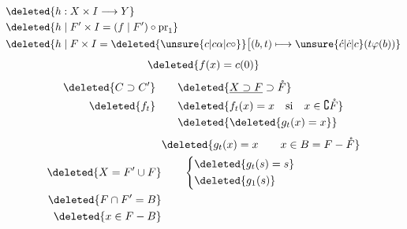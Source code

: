 \[
\begin{aligned}
&\deleted{h:X\times I\longrightarrow Y}\\
&\deleted{h\mid F'\times I=(f\mid F')\circ\mathrm{pr}_1}\\
&\deleted{h\mid F\times I=\deleted{\unsure{c|c\alpha|c\circ}}\bigl[(b,t)\longmapsto\unsure{\acute c|\dot c|c}(t\varphi(b))}
\end{aligned}
\]
\[
\deleted{f(x)=c(0)}
\]
\[
\begin{aligned}
\deleted{C\supset C'}&\qquad\deleted{\underline{X\supset F}\supset\mathring F}\\
\deleted{f_t}&\qquad\deleted{f_t(x)=x\quad\text{si}\quad x\in\complement\mathring F}\\
&\qquad\deleted{\deleted{g_t(x)=x}}
\end{aligned}
\]
\[
\begin{aligned}
&\deleted{g_t(x)=x\qquad x\in B=F-\mathring F}\\
\deleted{X=F'\cup F}&\qquad\left\{\begin{aligned}
&\deleted{g_t(s)=s}\\
&\deleted{g_1(s)}
\end{aligned}\right.\\
\deleted{F\cap F'=B}&\\
\deleted{x\in F-B}&
\end{aligned}
\]



